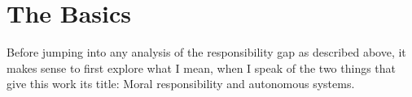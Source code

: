 \documentclass{article}
\begin{document}
%
%
%
\section{The Basics}


Before jumping into any analysis of the responsibility gap as described above,
it makes sense to first explore what I mean, when I speak of the two things that
give this work its title: Moral responsibility and autonomous systems.
\end{document}
